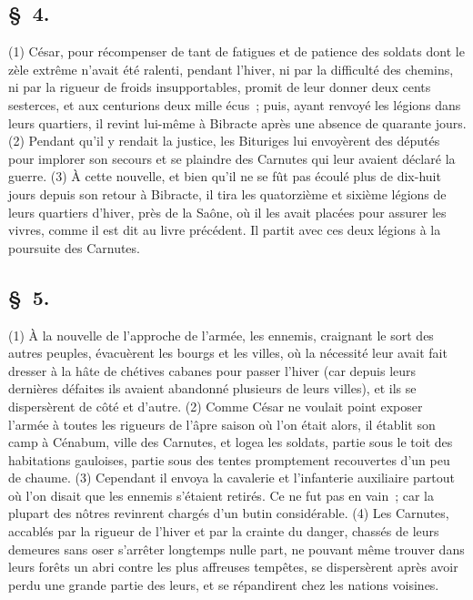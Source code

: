 \documentclass[french,twoside]{book} %
\begin{document}
\subsection[{§ 4.}]{ \textsc{§ 4.} }
\noindent (1) César, pour récompenser de tant de fatigues et de patience des soldats dont le zèle extrême n’avait été ralenti, pendant l’hiver, ni par la difficulté des chemins, ni par la rigueur de froids insupportables, promit de leur donner deux cents sesterces, et aux centurions deux mille écus ; puis, ayant renvoyé les légions dans leurs quartiers, il revint lui-même à Bibracte après une absence de quarante jours. (2) Pendant qu’il y rendait la justice, les Bituriges lui envoyèrent des députés pour implorer son secours et se plaindre des Carnutes qui leur avaient déclaré la guerre. (3) À cette nouvelle, et bien qu’il ne se fût pas écoulé plus de dix-huit jours depuis son retour à Bibracte, il tira les quatorzième et sixième légions de leurs quartiers d’hiver, près de la Saône, où il les avait placées pour assurer les vivres, comme il est dit au livre précédent. Il partit avec ces deux légions à la poursuite des Carnutes.
\subsection[{§ 5.}]{ \textsc{§ 5.} }
\noindent (1) À la nouvelle de l’approche de l’armée, les ennemis, craignant le sort des autres peuples, évacuèrent les bourgs et les villes, où la nécessité leur avait fait dresser à la hâte de chétives cabanes pour passer l’hiver (car depuis leurs dernières défaites ils avaient abandonné plusieurs de leurs villes), et ils se dispersèrent de côté et d’autre. (2) Comme César ne voulait point exposer l’armée à toutes les rigueurs de l’âpre saison où l’on était alors, il établit son camp à Cénabum, ville des Carnutes, et logea les soldats, partie sous le toit des habitations gauloises, partie sous des tentes promptement recouvertes d’un peu de chaume. (3) Cependant il envoya la cavalerie et l’infanterie auxiliaire partout où l’on disait que les ennemis s’étaient retirés. Ce ne fut pas en vain ; car la plupart des nôtres revinrent chargés d’un butin considérable. (4) Les Carnutes, accablés par la rigueur de l’hiver et par la crainte du danger, chassés de leurs demeures sans oser s’arrêter longtemps nulle part, ne pouvant même trouver dans leurs forêts un abri contre les plus affreuses tempêtes, se dispersèrent après avoir perdu une grande partie des leurs, et se répandirent chez les nations voisines.
\end{document}
